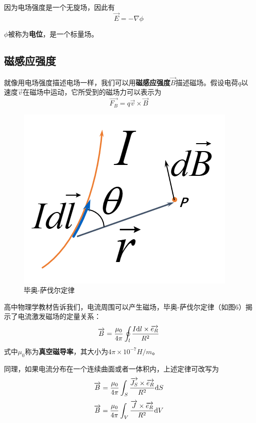 \documentclass[UTF8,a4paper,11pt]{article}
\begin{document}
因为电场强度是一个无旋场，因此有
\begin{equation}
\overrightarrow{E}=-\nabla\phi
\end{equation}

$\phi$被称为\textbf{电位}，是一个标量场。

\subsection{磁感应强度}
就像用电场强度描述电场一样，我们可以用\textbf{磁感应强度}$\overrightarrow{B}$描述磁场。假设电荷$q$以速度$\overrightarrow{v}$在磁场中运动，它所受到的磁场力可以表示为
\begin{equation}
\overrightarrow{F_B}=q\overrightarrow{v}\times\overrightarrow{B}
\end{equation}

\begin{figure}[htbp]
\centering
\includegraphics[scale=0.6]{p6.png}
\caption{毕奥-萨伐尔定律}
\end{figure}
高中物理学教材告诉我们，电流周围可以产生磁场，毕奥-萨伐尔定律（如图6）揭示了电流激发磁场的定量关系：
\begin{equation}
\overrightarrow{B}=\frac{\mu_0}{4\pi}\oint_l\frac{I{\rm d}l\times\overrightarrow{e_R}}{R^2}
\end{equation}
式中$\mu_0$称为\textbf{真空磁导率}，其大小为$4\pi\times10^{-7}H/m$。

同理，如果电流分布在一个连续曲面或者一体积内，上述定律可改写为
\begin{equation}
\overrightarrow{B}=\frac{\mu_0}{4\pi}\int_S\frac{\overrightarrow{J_S}\times\overrightarrow{e_R}}{R^2}{\rm d}S
\end{equation}
\begin{equation}
\overrightarrow{B}=\frac{\mu_0}{4\pi}\int_V\frac{\overrightarrow{J}\times\overrightarrow{e_R}}{R^2}{\rm d}V
\end{equation}
\end{document}

